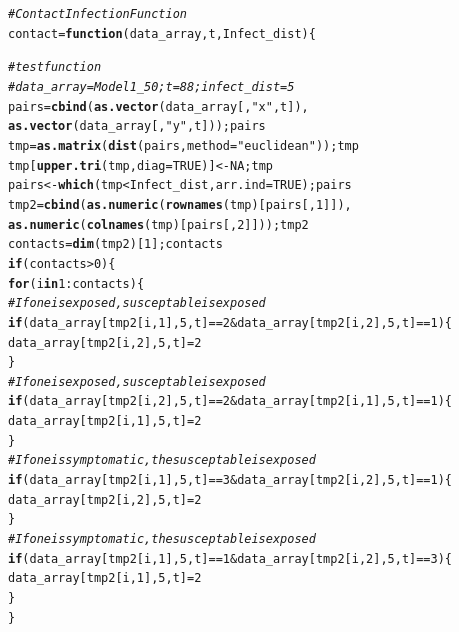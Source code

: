 \documentclass{article}\usepackage[]{graphicx}\usepackage[]{color}
\makeatletter
\newcommand{\hlnum}[1]{\textcolor[rgb]{0.686,0.059,0.569}{#1}}%
\newcommand{\hlstr}[1]{\textcolor[rgb]{0.192,0.494,0.8}{#1}}%
\newcommand{\hlcom}[1]{\textcolor[rgb]{0.678,0.584,0.686}{\textit{#1}}}%
\newcommand{\hlopt}[1]{\textcolor[rgb]{0,0,0}{#1}}%
\newcommand{\hlstd}[1]{\textcolor[rgb]{0.345,0.345,0.345}{#1}}%
\newcommand{\hlkwa}[1]{\textcolor[rgb]{0.161,0.373,0.58}{\textbf{#1}}}%
\newcommand{\hlkwb}[1]{\textcolor[rgb]{0.69,0.353,0.396}{#1}}%
\newcommand{\hlkwc}[1]{\textcolor[rgb]{0.333,0.667,0.333}{#1}}%
\newcommand{\hlkwd}[1]{\textcolor[rgb]{0.737,0.353,0.396}{\textbf{#1}}}%
\newenvironment{kframe}{%
 \def\at@end@of@kframe{}%
 \ifinner\ifhmode%
  \def\at@end@of@kframe{\end{minipage}}%
  \begin{minipage}{\columnwidth}%
 \fi\fi%
 \def\FrameCommand##1{\hskip\@totalleftmargin \hskip-\fboxsep
 \colorbox{shadecolor}{##1}\hskip-\fboxsep
     \hskip-\linewidth \hskip-\@totalleftmargin \hskip\columnwidth}%
 \MakeFramed {\advance\hsize-\width
   \@totalleftmargin\z@ \linewidth\hsize
   \@setminipage}}%
 {\par\unskip\endMakeFramed%
 \at@end@of@kframe}
\newenvironment{knitrout}{}{} %
\makeatother
\begin{document}
\begin{knitrout}
\color{fgcolor}\begin{kframe}
\begin{alltt}
\hlcom{# Contact Infection Function}
\hlstd{contact} \hlkwb{=} \hlkwa{function}\hlstd{(}\hlkwc{data_array}\hlstd{,} \hlkwc{t}\hlstd{,} \hlkwc{Infect_dist}\hlstd{)\{}

\hlcom{# testfunction}
  \hlcom{#data_array=Model1_50; t=88; infect_dist = 5}
  \hlstd{pairs} \hlkwb{=} \hlkwd{cbind}\hlstd{(}\hlkwd{as.vector}\hlstd{(data_array[,}\hlstr{"x"}\hlstd{,t]),}
          \hlkwd{as.vector}\hlstd{(data_array[,}\hlstr{"y"}\hlstd{,t])); pairs}
  \hlstd{tmp} \hlkwb{=} \hlkwd{as.matrix}\hlstd{(}\hlkwd{dist}\hlstd{(pairs,} \hlkwc{method} \hlstd{=} \hlstr{"euclidean"} \hlstd{)); tmp}
  \hlstd{tmp[}\hlkwd{upper.tri}\hlstd{(tmp,} \hlkwc{diag} \hlstd{=} \hlnum{TRUE}\hlstd{)]} \hlkwb{<-} \hlnum{NA}\hlstd{; tmp}
  \hlstd{pairs} \hlkwb{<-} \hlkwd{which}\hlstd{(tmp} \hlopt{<} \hlstd{Infect_dist ,}\hlkwc{arr.ind} \hlstd{=} \hlnum{TRUE}\hlstd{);pairs}
  \hlstd{tmp2} \hlkwb{=} \hlkwd{cbind}\hlstd{(}\hlkwd{as.numeric}\hlstd{(}\hlkwd{rownames}\hlstd{(tmp)[pairs[,} \hlnum{1}\hlstd{]]),}
               \hlkwd{as.numeric}\hlstd{(}\hlkwd{colnames}\hlstd{(tmp)[pairs[,} \hlnum{2}\hlstd{]])); tmp2}
  \hlstd{contacts} \hlkwb{=} \hlkwd{dim}\hlstd{(tmp2)[}\hlnum{1}\hlstd{]; contacts}
  \hlkwa{if}\hlstd{(contacts}\hlopt{>}\hlnum{0}\hlstd{)\{}
    \hlkwa{for}\hlstd{(i} \hlkwa{in} \hlnum{1}\hlopt{:}\hlstd{contacts)\{}
      \hlcom{# If one is exposed, susceptable is exposed}
      \hlkwa{if}\hlstd{(data_array[tmp2[i,}\hlnum{1}\hlstd{],}\hlnum{5}\hlstd{,t]}\hlopt{==}\hlnum{2} \hlopt{&} \hlstd{data_array[tmp2[i,}\hlnum{2}\hlstd{],}\hlnum{5}\hlstd{,t]}\hlopt{==}\hlnum{1}\hlstd{)\{}
      \hlstd{data_array[tmp2[i,}\hlnum{2}\hlstd{],}\hlnum{5}\hlstd{,t]} \hlkwb{=} \hlnum{2}
      \hlstd{\}}
      \hlcom{# If one is exposed, susceptable is exposed}
      \hlkwa{if}\hlstd{(data_array[tmp2[i,}\hlnum{2}\hlstd{],}\hlnum{5}\hlstd{,t]}\hlopt{==}\hlnum{2} \hlopt{&} \hlstd{data_array[tmp2[i,}\hlnum{1}\hlstd{],}\hlnum{5}\hlstd{,t]}\hlopt{==}\hlnum{1}\hlstd{)\{}
      \hlstd{data_array[tmp2[i,}\hlnum{1}\hlstd{],}\hlnum{5}\hlstd{,t]} \hlkwb{=} \hlnum{2}
      \hlstd{\}}
      \hlcom{# If one is symptomatic, the susceptable is exposed}
      \hlkwa{if}\hlstd{(data_array[tmp2[i,}\hlnum{1}\hlstd{],}\hlnum{5}\hlstd{,t]}\hlopt{==}\hlnum{3} \hlopt{&} \hlstd{data_array[tmp2[i,}\hlnum{2}\hlstd{],}\hlnum{5}\hlstd{,t]}\hlopt{==}\hlnum{1}\hlstd{)\{}
      \hlstd{data_array[tmp2[i,}\hlnum{2}\hlstd{],} \hlnum{5}\hlstd{, t]} \hlkwb{=} \hlnum{2}
      \hlstd{\}}
      \hlcom{# If one is symptomatic, the susceptable is exposed}
      \hlkwa{if}\hlstd{(data_array[tmp2[i,}\hlnum{1}\hlstd{],}\hlnum{5}\hlstd{,t]}\hlopt{==}\hlnum{1} \hlopt{&} \hlstd{data_array[tmp2[i,}\hlnum{2}\hlstd{],}\hlnum{5}\hlstd{,t]}\hlopt{==}\hlnum{3}\hlstd{)\{}
      \hlstd{data_array[tmp2[i,}\hlnum{1}\hlstd{],} \hlnum{5}\hlstd{, t]} \hlkwb{=} \hlnum{2}
      \hlstd{\}}
    \hlstd{\}}


\end{alltt}
\end{kframe}
\end{knitrout}
\end{document}
